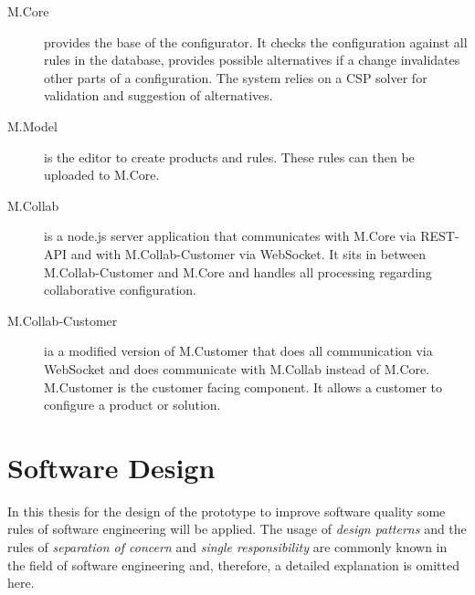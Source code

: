 \begin{description}
    \item[M.Core] provides the base of the configurator. It checks the configuration against all rules in the database, provides possible alternatives if a change invalidates other parts of a configuration. The system relies on a CSP solver for validation and suggestion of alternatives.
    \item[M.Model] is the editor to create products and rules. These rules can then be uploaded to M.Core.
    \item[M.Collab] is a node.js server application that communicates with M.Core via REST-API and with M.Collab-Customer via WebSocket. It sits in between M.Collab-Customer and M.Core and handles all processing regarding collaborative configuration.
    \item[M.Collab-Customer] ia a modified version of M.Customer that does all communication via WebSocket and does communicate with M.Collab instead of M.Core. M.Customer is the customer facing component. It allows a customer to configure a product or solution.
\end{description}

\section{Software Design}
\label{sec:Foundations:BaseSystem}

In this thesis for the design of the prototype to improve software quality some rules of software engineering will be applied. The usage of \emph{design patterns} \cite{gamma2015design} and the rules of \emph{separation of concern} \cite{de2002importance} and \emph{single responsibility} \cite{martinCleanArchitectureCraftsman2017} are commonly known in the field of software engineering and, therefore, a detailed explanation is omitted here.


